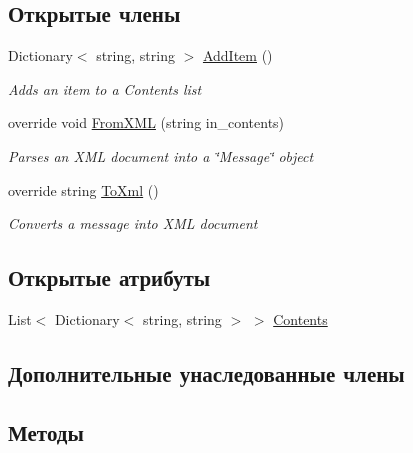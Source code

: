 \subsection*{Открытые члены}
\begin{DoxyCompactItemize}
\item 
Dictionary$<$ string, string $>$ \hyperlink{class_sample_shop_server_1_1_server_message_ae4bcc80af54bc71f11cb5845d52e6726}{Add\+Item} ()
\begin{DoxyCompactList}\small\item\em Adds an item to a Contents list \end{DoxyCompactList}\item 
override void \hyperlink{class_sample_shop_server_1_1_server_message_a6c29811c79d624943183b6afeada2b18}{From\+X\+M\+L} (string in\+\_\+contents)
\begin{DoxyCompactList}\small\item\em Parses an X\+M\+L document into a \char`\"{}\+Message\char`\"{} object \end{DoxyCompactList}\item 
override string \hyperlink{class_sample_shop_server_1_1_server_message_ae5eb28a2450cb004d32d8c55c6861745}{To\+Xml} ()
\begin{DoxyCompactList}\small\item\em Converts a message into X\+M\+L document \end{DoxyCompactList}\end{DoxyCompactItemize}
\subsection*{Открытые атрибуты}
\begin{DoxyCompactItemize}
\item 
List$<$ Dictionary$<$ string, string $>$ $>$ \hyperlink{class_sample_shop_server_1_1_server_message_a6ff06e51dedd9dce6a7b683accf3c60d}{Contents}
\end{DoxyCompactItemize}
\subsection*{Дополнительные унаследованные члены}


\subsection{Методы}
\hypertarget{class_sample_shop_server_1_1_server_message_ae4bcc80af54bc71f11cb5845d52e6726}{}
